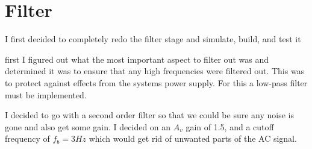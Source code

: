 \documentclass{article}
\begin{document}
\section*{Filter}
I first decided to completely redo the filter stage and simulate, build, and test it

first I figured out what the most important aspect to filter out was and determined it was to ensure that any high frequencies were filtered out. This was to protect against effects from the systems power supply. For this a low-pass filter must be implemented. 

I decided to go with a second order filter so that we could be sure any noise is gone and also get some gain. I decided on an $A_v$ gain of 1.5, and a cutoff frequency of $f_b = 3Hz$ which would get rid of unwanted parts of the AC signal.
\end{document}
